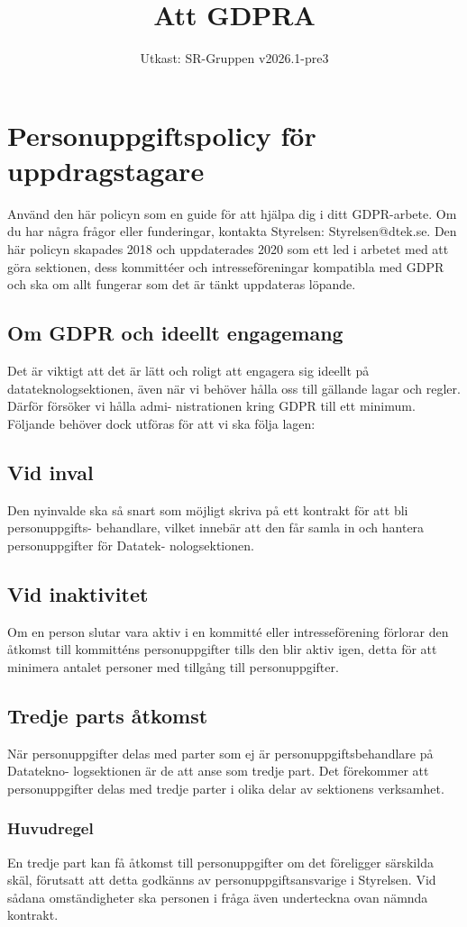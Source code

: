 \documentclass[a4paper]{dtek}
\title{Att GDPRA}
\date{Utkast: SR-Gruppen v2026.1-pre3}
\begin{document}
\section{Personuppgiftspolicy för uppdragstagare}
Använd den här policyn som en guide för att hjälpa dig i ditt GDPR-arbete. Om du har
några frågor eller funderingar, kontakta Styrelsen: Styrelsen@dtek.se.
Den här policyn skapades 2018 och uppdaterades 2020 som ett led i arbetet med att göra
sektionen, dess kommittéer och intresseföreningar kompatibla med GDPR och ska om allt
fungerar som det är tänkt uppdateras löpande.

\subsection{Om GDPR och ideellt engagemang}
Det är viktigt att det är lätt och roligt att engagera sig ideellt på datateknologsektionen,
även när vi behöver hålla oss till gällande lagar och regler. Därför försöker vi hålla admi-
nistrationen kring GDPR till ett minimum. Följande behöver dock utföras för att vi ska
följa lagen:

\subsection{Vid inval}
Den nyinvalde ska så snart som möjligt skriva på ett kontrakt för att bli personuppgifts-
behandlare, vilket innebär att den får samla in och hantera personuppgifter för Datatek-
nologsektionen.

\subsection{Vid inaktivitet}
Om en person slutar vara aktiv i en kommitté eller intresseförening förlorar den åtkomst
till kommitténs personuppgifter tills den blir aktiv igen, detta för att minimera antalet
personer med tillgång till personuppgifter.

\subsection{Tredje parts åtkomst}
När personuppgifter delas med parter som ej är personuppgiftsbehandlare på Datatekno-
logsektionen är de att anse som tredje part. Det förekommer att personuppgifter delas med
tredje parter i olika delar av sektionens verksamhet.

\subsubsection{Huvudregel}
En tredje part kan få åtkomst till personuppgifter om det föreligger särskilda skäl, förutsatt
att detta godkänns av personuppgiftsansvarige i Styrelsen. Vid sådana omständigheter ska
personen i fråga även underteckna ovan nämnda kontrakt.
\end{document}
